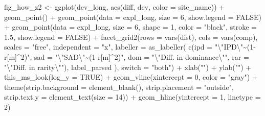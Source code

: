 \documentclass[
  letterpaper,
  DIV=11,
  numbers=noendperiod]{scrartcl}
\newenvironment{Shaded}{\begin{snugshade}}{\end{snugshade}}
\newcommand{\AttributeTok}[1]{\textcolor[rgb]{0.40,0.45,0.13}{#1}}
\newcommand{\ConstantTok}[1]{\textcolor[rgb]{0.56,0.35,0.01}{#1}}
\newcommand{\DecValTok}[1]{\textcolor[rgb]{0.68,0.00,0.00}{#1}}
\newcommand{\FloatTok}[1]{\textcolor[rgb]{0.68,0.00,0.00}{#1}}
\newcommand{\FunctionTok}[1]{\textcolor[rgb]{0.28,0.35,0.67}{#1}}
\newcommand{\NormalTok}[1]{\textcolor[rgb]{0.00,0.23,0.31}{#1}}
\newcommand{\OtherTok}[1]{\textcolor[rgb]{0.00,0.23,0.31}{#1}}
\newcommand{\SpecialCharTok}[1]{\textcolor[rgb]{0.37,0.37,0.37}{#1}}
\newcommand{\StringTok}[1]{\textcolor[rgb]{0.13,0.47,0.30}{#1}}
\begin{document}
\begin{Shaded}
\begin{Highlighting}[]
\NormalTok{fig\_how\_z2 }\OtherTok{\textless{}{-}} \FunctionTok{ggplot}\NormalTok{(dev\_long, }\FunctionTok{aes}\NormalTok{(diff, dev, }\AttributeTok{color =}\NormalTok{ site\_name)) }\SpecialCharTok{+}
    \FunctionTok{geom\_point}\NormalTok{() }\SpecialCharTok{+}
    \FunctionTok{geom\_point}\NormalTok{(}\AttributeTok{data =}\NormalTok{ expl\_long, }\AttributeTok{size =} \DecValTok{6}\NormalTok{, }\AttributeTok{show.legend =} \ConstantTok{FALSE}\NormalTok{) }\SpecialCharTok{+}
    \FunctionTok{geom\_point}\NormalTok{(}\AttributeTok{data =}\NormalTok{ expl\_long, }\AttributeTok{size =} \DecValTok{6}\NormalTok{, }\AttributeTok{shape =} \DecValTok{1}\NormalTok{, }\AttributeTok{color =} \StringTok{"black"}\NormalTok{,}
               \AttributeTok{stroke =} \FloatTok{1.5}\NormalTok{, }\AttributeTok{show.legend =} \ConstantTok{FALSE}\NormalTok{) }\SpecialCharTok{+}
    \FunctionTok{facet\_grid2}\NormalTok{(}\AttributeTok{rows =} \FunctionTok{vars}\NormalTok{(dist), }\AttributeTok{cols =} \FunctionTok{vars}\NormalTok{(comp), }
                \AttributeTok{scales =} \StringTok{"free"}\NormalTok{, }\AttributeTok{independent =} \StringTok{"x"}\NormalTok{, }
                \AttributeTok{labeller =} \FunctionTok{as\_labeller}\NormalTok{(}
                    \FunctionTok{c}\NormalTok{(}\AttributeTok{ipd =} \StringTok{"}\SpecialCharTok{\textbackslash{}"}\StringTok{IPD}\SpecialCharTok{\textbackslash{}"}\StringTok{\textasciitilde{}(1{-}r[m]\^{}2)"}\NormalTok{, }
                      \AttributeTok{sad =} \StringTok{"}\SpecialCharTok{\textbackslash{}"}\StringTok{SAD}\SpecialCharTok{\textbackslash{}"}\StringTok{\textasciitilde{}(1{-}r[m]\^{}2)"}\NormalTok{, }
                      \AttributeTok{dom =} \StringTok{"}\SpecialCharTok{\textbackslash{}"}\StringTok{Diff. in dominance}\SpecialCharTok{\textbackslash{}"}\StringTok{"}\NormalTok{, }
                      \AttributeTok{rar =} \StringTok{"}\SpecialCharTok{\textbackslash{}"}\StringTok{Diff. in rarity}\SpecialCharTok{\textbackslash{}"}\StringTok{"}\NormalTok{),}
\NormalTok{                    label\_parsed}
\NormalTok{                ), }
                \AttributeTok{switch =} \StringTok{"both"}\NormalTok{) }\SpecialCharTok{+}
    \FunctionTok{xlab}\NormalTok{(}\StringTok{""}\NormalTok{) }\SpecialCharTok{+}
    \FunctionTok{ylab}\NormalTok{(}\StringTok{""}\NormalTok{) }\SpecialCharTok{+}
    \FunctionTok{this\_ms\_look}\NormalTok{(}\AttributeTok{log\_y =} \ConstantTok{TRUE}\NormalTok{) }\SpecialCharTok{+}
    \FunctionTok{geom\_vline}\NormalTok{(}\AttributeTok{xintercept =} \DecValTok{0}\NormalTok{, }\AttributeTok{color =} \StringTok{"gray"}\NormalTok{) }\SpecialCharTok{+}
    \FunctionTok{theme}\NormalTok{(}\AttributeTok{strip.background =} \FunctionTok{element\_blank}\NormalTok{(), }
          \AttributeTok{strip.placement =} \StringTok{"outside"}\NormalTok{,}
          \AttributeTok{strip.text.y =} \FunctionTok{element\_text}\NormalTok{(}\AttributeTok{size =} \DecValTok{14}\NormalTok{)) }\SpecialCharTok{+}
    \FunctionTok{geom\_hline}\NormalTok{(}\AttributeTok{yintercept =} \DecValTok{1}\NormalTok{, }\AttributeTok{linetype =} \DecValTok{2}\NormalTok{) }


\end{Highlighting}
\end{Shaded}
\end{document}
